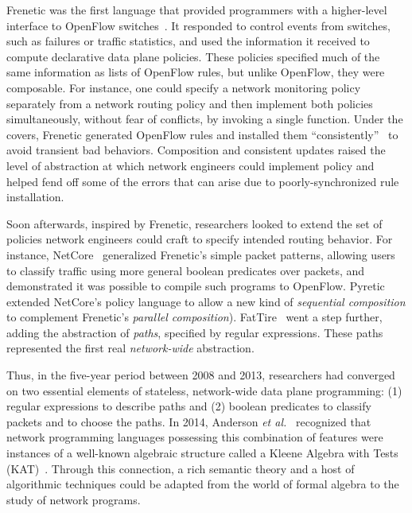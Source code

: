 \documentclass[10pt]{sigalternate052015}
\begin{document}
Frenetic was the first language that provided programmers with
a higher-level interface to OpenFlow switches~\cite{frenetic}.  It responded to control
events from switches, such as failures or traffic statistics, and used
the information it received to compute declarative data plane
policies.  These policies specified much of the same information as
lists of OpenFlow rules, but unlike OpenFlow, they were composable.  For
instance, one could specify a network monitoring policy separately
from a network routing policy and then implement both policies
simultaneously, without fear of conflicts, by invoking a single
function.  Under the covers, Frenetic 
generated OpenFlow rules and installed them
``consistently''~\cite{consistent-updates} to avoid transient bad
behaviors.  Composition and consistent updates
raised the level of abstraction at which
network engineers could implement policy and helped fend off some of
the errors that can arise due to poorly-synchronized rule installation.

Soon afterwards, inspired by Frenetic, researchers looked to extend the set of
policies network engineers could craft to specify intended routing
behavior.
For instance,
NetCore~\cite{netcore} generalized Frenetic's
simple packet patterns, allowing users to classify traffic
using more general boolean predicates over packets, and demonstrated
it was possible to compile
such programs to OpenFlow.
Pyretic~\cite{pyretic} extended NetCore's policy language to allow a
new kind of \emph{sequential composition} to complement Frenetic's
\emph{parallel composition}).  FatTire~\cite{fattire} went a step
further, adding the
abstraction of \emph{paths}, specified by regular expressions.
These paths represented the first real \emph{network-wide}
abstraction.

Thus, in the five-year period between 2008 and 2013,
researchers had converged on two essential elements of stateless,
network-wide data
plane programming:  (1) regular expressions to describe paths and (2)
boolean predicates to classify packets and to choose the paths.  In 2014, Anderson \emph{et al.}~\cite{netkat}
recognized that network programming languages possessing this
combination of features were instances of a well-known algebraic
structure called a Kleene Algebra with Tests
(KAT)~\cite{kat}.  Through this connection, a rich semantic
theory and a host of algorithmic techniques could be adapted from the
world of formal algebra to the study of network programs.
\end{document}
